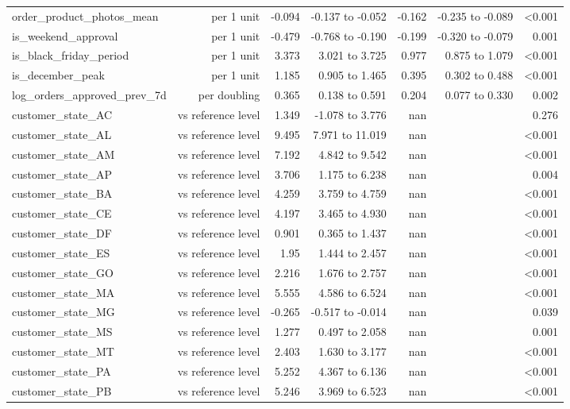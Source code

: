 \begin{table}[htbp]
\begin{tabular}{lrrrrrr}
order\_product\_photos\_mean & per 1 unit & -0.094 & -0.137 to -0.052 & -0.162 & -0.235 to -0.089 & <0.001 \\
is\_weekend\_approval & per 1 unit & -0.479 & -0.768 to -0.190 & -0.199 & -0.320 to -0.079 & 0.001 \\
is\_black\_friday\_period & per 1 unit & 3.373 & 3.021 to 3.725 & 0.977 & 0.875 to 1.079 & <0.001 \\
is\_december\_peak & per 1 unit & 1.185 & 0.905 to 1.465 & 0.395 & 0.302 to 0.488 & <0.001 \\
log\_orders\_approved\_prev\_7d & per doubling & 0.365 & 0.138 to 0.591 & 0.204 & 0.077 to 0.330 & 0.002 \\
customer\_state\_AC & vs reference level & 1.349 & -1.078 to 3.776 & nan &  & 0.276 \\
customer\_state\_AL & vs reference level & 9.495 & 7.971 to 11.019 & nan &  & <0.001 \\
customer\_state\_AM & vs reference level & 7.192 & 4.842 to 9.542 & nan &  & <0.001 \\
customer\_state\_AP & vs reference level & 3.706 & 1.175 to 6.238 & nan &  & 0.004 \\
customer\_state\_BA & vs reference level & 4.259 & 3.759 to 4.759 & nan &  & <0.001 \\
customer\_state\_CE & vs reference level & 4.197 & 3.465 to 4.930 & nan &  & <0.001 \\
customer\_state\_DF & vs reference level & 0.901 & 0.365 to 1.437 & nan &  & <0.001 \\
customer\_state\_ES & vs reference level & 1.95 & 1.444 to 2.457 & nan &  & <0.001 \\
customer\_state\_GO & vs reference level & 2.216 & 1.676 to 2.757 & nan &  & <0.001 \\
customer\_state\_MA & vs reference level & 5.555 & 4.586 to 6.524 & nan &  & <0.001 \\
customer\_state\_MG & vs reference level & -0.265 & -0.517 to -0.014 & nan &  & 0.039 \\
customer\_state\_MS & vs reference level & 1.277 & 0.497 to 2.058 & nan &  & 0.001 \\
customer\_state\_MT & vs reference level & 2.403 & 1.630 to 3.177 & nan &  & <0.001 \\
customer\_state\_PA & vs reference level & 5.252 & 4.367 to 6.136 & nan &  & <0.001 \\
customer\_state\_PB & vs reference level & 5.246 & 3.969 to 6.523 & nan &  & <0.001 \\

\end{tabular}
\end{table}
